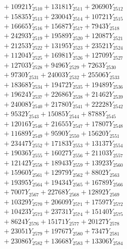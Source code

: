 \documentclass[a4paper,10pt]{article}
\begin{document}
{\begin{align}
&\;  + 10921 Y_{2510} + 13181 Y_{2511} + 20690 Y_{2512} \\[0.3ex]
&\;  + 15835 Y_{2513} + 23004 Y_{2514} + 10721 Y_{2515} \\[0.3ex]
&\;  + 16665 Y_{2516} + 15687 Y_{2517} + 7943 Y_{2518} \\[0.5ex]\allowbreak
&\;  + 24293 Y_{2519} + 19589 Y_{2520} + 12087 Y_{2521} \\[0.3ex]
&\;  + 21253 Y_{2522} + 13195 Y_{2523} + 23521 Y_{2524} \\[0.3ex]
&\;  + 11204 Y_{2525} + 16981 Y_{2526} + 12709 Y_{2527} \\[0.3ex]
&\;  + 12703 Y_{2528} + 9496 Y_{2529} + 7263 Y_{2530} \\[0.3ex]
&\;  + 9730 Y_{2531} + 24003 Y_{2532} + 25506 Y_{2533} \\[0.3ex]
&\;  + 18368 Y_{2534} + 19472 Y_{2535} + 19489 Y_{2536} \\[0.3ex]
&\;  + 19624 Y_{2537} + 22686 Y_{2538} + 21462 Y_{2539} \\[0.3ex]
&\;  + 24008 Y_{2540} + 21780 Y_{2541} + 22228 Y_{2542} \\[0.3ex]
&\;  + 9532 Y_{2543} + 15085 Y_{2544} + 8788 Y_{2545} \\[0.3ex]
&\;  + 12016 Y_{2546} + 21655 Y_{2547} + 17807 Y_{2548} \\[0.5ex]\allowbreak
&\;  + 11689 Y_{2549} + 9590 Y_{2550} + 15620 Y_{2551} \\[0.3ex]
&\;  + 23447 Y_{2552} + 17183 Y_{2553} + 13137 Y_{2554} \\[0.3ex]
&\;  + 19036 Y_{2555} + 16027 Y_{2556} + 21103 Y_{2557} \\[0.3ex]
&\;  + 12142 Y_{2558} + 18943 Y_{2559} + 13923 Y_{2560} \\[0.3ex]
&\;  + 15960 Y_{2561} + 12979 Y_{2562} + 8802 Y_{2563} \\[0.3ex]
&\;  + 19395 Y_{2564} + 19434 Y_{2565} + 16789 Y_{2566} \\[0.3ex]
&\;  + 7007 Y_{2567} + 22768 Y_{2568} + 12892 Y_{2569} \\[0.3ex]
&\;  + 10329 Y_{2570} + 20609 Y_{2571} + 17597 Y_{2572} \\[0.3ex]
&\;  + 10423 Y_{2573} + 23731 Y_{2574} + 15140 Y_{2575} \\[0.3ex]
&\;  + 8624 Y_{2576} + 15171 Y_{2577} + 20127 Y_{2578} \\[0.5ex]\allowbreak
&\;  + 23051 Y_{2579} + 19767 Y_{2580} + 7347 Y_{2581} \\[0.3ex]
&\;  + 23086 Y_{2582} + 13668 Y_{2583} + 13306 Y_{2584} \\[0.3ex]

\end{align}}
\end{document}
